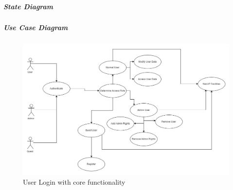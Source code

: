 \subparagraph{State Diagram}

\begin{figure}[H]
\end{figure}




\subparagraph{Use Case Diagram}

\begin{figure}[H]
		\centering
		\includegraphics[width=\textwidth]{img/UserUseCase.jpg}
		\caption{User Login with core functionality }
\end{figure}



